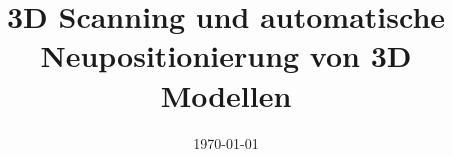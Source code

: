 \documentclass[t, aspectratio=169]{beamer}
\begin{document}
\title[]{3D Scanning und automatische
Neupositionierung von 3D Modellen}
\author[Niklas Thieme]{\small \underline{}}
\date{\today}
\begin{frame}[plain]
  \maketitle
  \vspace{1.5cm}  
\end{frame}

%
\end{document}
